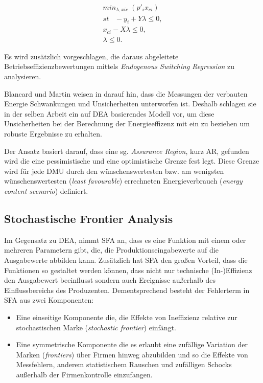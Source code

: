 \begin{gather}
	min_{\lambda,xic} \; (p'_{i}x_{ci}) \\
	st \;\;\; - y_i+Y\lambda \leq 0, \\
	x_{ci} - X \lambda \leq 0, \\
	\lambda \leq 0.
\end{gather}

Es wird zusätzlich vorgeschlagen, die daraus abgeleitete Betriebseffizienzbewertungen mittels \textit{Endogenous Switching Regression} zu analysieren.

Blancard und Martin weisen in \cite{jour:Blancard2014} darauf hin, dass die Messungen der verbauten Energie Schwankungen und Unsicherheiten unterworfen ist. Deshalb schlagen sie in der selben Arbeit ein auf DEA basierendes Modell vor, um diese Unsicherheiten bei der Berechnung der Energieeffizenz mit ein zu beziehen um robuste Ergebnisse zu erhalten.

Der Ansatz basiert darauf, dass eine sg. \textit{Assurance Region}, kurz AR, gefunden wird die eine pessimistische und eine optimistische Grenze fest legt. Diese Grenze wird für jede DMU durch den wünschenswertesten bzw. am wenigsten wünschenswertesten (\textit{least favourable}) errechneten Energieverbrauch (\textit{energy content scenario}) definiert.\cite{jour:Blancard2014}

\subsection{Stochastische Frontier Analysis}
Im Gegensatz zu DEA, nimmt SFA an, dass es eine Funktion mit einem oder mehreren Parametern gibt, die, die Produktionseingabewerte auf die Ausgabewerte abbilden kann. Zusätzlich hat SFA den großen Vorteil, dass die Funktionen so gestaltet werden können, dass nicht nur technische (In-)Effizienz den Ausgabewert beeinflusst sondern auch Ereignisse außerhalb des Einflussbereichs des Produzenten. Dementsprechend besteht der Fehlerterm in SFA aus zwei Komponenten:
\begin{itemize}
	\item Eine einseitige Komponente die, die Effekte von Ineffizienz relative zur stochastischen Marke (\textit{stochastic frontier}) einfängt.
	\item Eine symmetrische Komponente die es erlaubt eine zufällige Variation der Marken (\textit{frontiers}) über Firmen hinweg abzubilden und so die Effekte von Messfehlern, anderem statistischem Rauschen und zufälligen Schocks außerhalb der Firmenkontrolle einzufangen.
\end{itemize}

